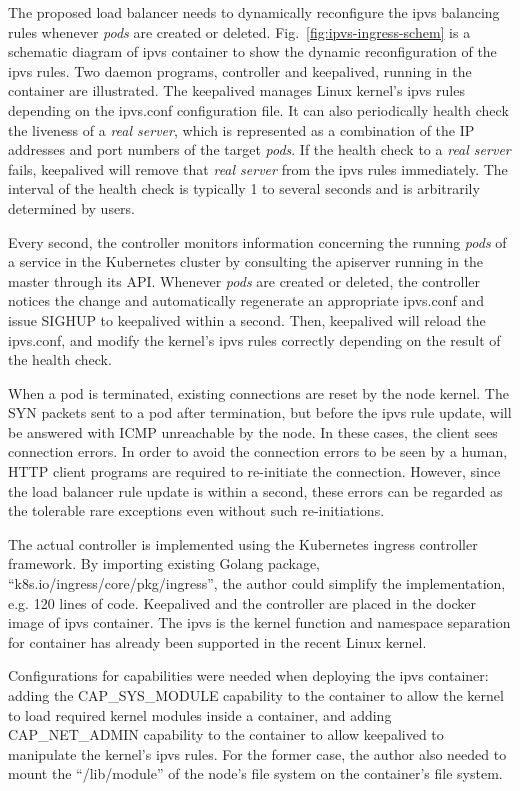 The proposed load balancer needs to dynamically reconfigure the ipvs balancing rules whenever {\em pods} are created or deleted. 
Fig.~\ref{fig:ipvs-ingress-schem} is a schematic diagram of ipvs container to show the dynamic reconfiguration of the ipvs rules.
Two daemon programs, controller and keepalived, running in the container are illustrated.
The keepalived manages Linux kernel's ipvs rules depending on the ipvs.conf configuration file.
It can also periodically health check the liveness of a {\em real server}, 
which is represented as a combination of the IP addresses and port numbers of the target {\em pods}. 
If the health check to a {\em real server} fails, keepalived will remove that {\em real server} from the ipvs rules immediately.
The interval of the health check is typically 1 to several seconds and is arbitrarily determined by users.  

Every second, the controller monitors information concerning the running {\em pods} of a service in the Kubernetes cluster by consulting the apiserver running in the master through its API.
Whenever {\em pods} are created or deleted, the controller notices the change and automatically regenerate an appropriate ipvs.conf 
and issue SIGHUP to keepalived within a second.
Then, keepalived will reload the ipvs.conf, and modify the kernel's ipvs rules correctly depending on the result of the health check.

When a pod is terminated, existing connections are reset by the node kernel.
The SYN packets sent to a pod after termination, but before the ipvs rule update, will be answered with ICMP unreachable by the node.
In these cases, the client sees connection errors.
In order to avoid the connection errors to be seen by a human, HTTP client programs are required to re-initiate the connection.
However, since the load balancer rule update is within a second, these errors can be regarded as the tolerable rare exceptions even without such re-initiations.

The actual controller\cite{ktaka_ccmp_2017_826894} is implemented using the Kubernetes ingress controller\cite{K8sIngress2017} framework. 
By importing existing Golang package, \enquote{k8s.io/ingress/core/pkg/ingress}, the author could simplify the implementation, e.g. 
120 lines of code.  
%
Keepalived and the controller are placed in the docker image of ipvs container.
The ipvs is the kernel function and namespace separation for container has already been supported in the recent Linux kernel. 

Configurations for capabilities were needed when deploying the ipvs container: adding the CAP\_SYS\_MODULE capability 
to the container to allow the kernel to load required kernel modules inside a container, 
and adding CAP\_NET\_ADMIN capability to the container to allow keepalived to manipulate the kernel's ipvs rules. 
For the former case, the author also needed to mount the \enquote{/lib/module} of the node's file system on the container's file system.

